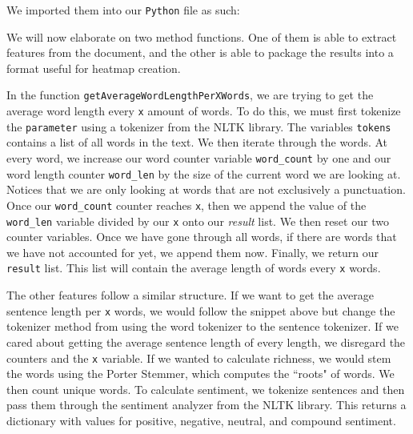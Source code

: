 \documentclass[runningheads]{llncs}
\begin{document}
We imported them into our \texttt{Python} file as such:


We will now elaborate on two method functions. One of them is able to extract features from the document, and the other is able to package the results into a format useful for heatmap creation.

%

In the function \texttt{getAverageWordLengthPerXWords}, we are trying to get the average word length every \texttt{x} amount of words. To do this, we must first tokenize the \texttt{parameter} using a tokenizer from the NLTK library. The variables \texttt{tokens} contains a list of all words in the text. We then iterate through the words. At every word, we increase our word counter variable \texttt{word\_count} by one and our word length counter \texttt{word\_len} by the size of the current word we are looking at. Notices that we are only looking at words that are not exclusively a punctuation. Once our \texttt{word\_count} counter reaches \texttt{x}, then we append the value of the \texttt{word\_len} variable divided by our \texttt{x} onto our \textit{result} list. We then reset our two counter variables. Once we have gone through all words, if there are words that we have not accounted for yet, we append them now. Finally, we return our \texttt{result} list. This list will contain the average length of words every \texttt{x} words. 

The other features follow a similar structure. If we want to get the average sentence length per \texttt{x} words, we would follow the snippet above but change the tokenizer method from using the word tokenizer to the sentence tokenizer. If we cared about getting the average sentence length of every length, we disregard the counters and the \texttt{x} variable. If we wanted to calculate richness, we would stem the words using the Porter Stemmer, which computes the ``roots" of words. We then count unique words. To calculate sentiment, we tokenize sentences and then pass them through the sentiment analyzer from the NLTK library. This returns a dictionary with values for positive, negative, neutral, and compound sentiment.
\end{document}
